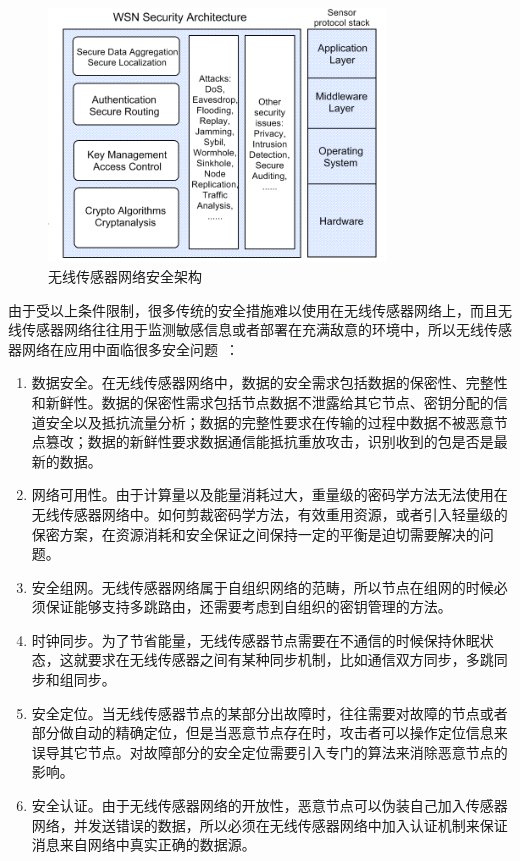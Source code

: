 \documentclass[a4paper,10pt]{article}
\begin{document}
\begin{figure}[htbp]
  \centering
  \includegraphics[width=0.8\textwidth,keepaspectratio]{wsn_sec_map}
  \caption{\label{wsn_sec_map}无线传感器网络安全架构~\cite{Li2005}}
\end{figure}

由于受以上条件限制，很多传统的安全措施难以使用在无线传感器网络上，而且无线传感器网络往往用于监测敏感信息或者部署在充满敌意的环境中，所以无线传感器网络在应用中面临很多安全问题~\cite{Xiao2006}：

\begin{enumerate}

\item 数据安全。在无线传感器网络中，数据的安全需求包括数据的保密性、完整性和新鲜性。数据的保密性需求包括节点数据不泄露给其它节点、密钥分配的信道安全以及抵抗流量分析；数据的完整性要求在传输的过程中数据不被恶意节点篡改；数据的新鲜性要求数据通信能抵抗重放攻击，识别收到的包是否是最新的数据。

\item 网络可用性。由于计算量以及能量消耗过大，重量级的密码学方法无法使用在无线传感器网络中。如何剪裁密码学方法，有效重用资源，或者引入轻量级的保密方案，在资源消耗和安全保证之间保持一定的平衡是迫切需要解决的问题。

\item 安全组网。无线传感器网络属于自组织网络的范畴，所以节点在组网的时候必须保证能够支持多跳路由，还需要考虑到自组织的密钥管理的方法。

\item 时钟同步。为了节省能量，无线传感器节点需要在不通信的时候保持休眠状态，这就要求在无线传感器之间有某种同步机制，比如通信双方同步，多跳同步和组同步。

\item 安全定位。当无线传感器节点的某部分出故障时，往往需要对故障的节点或者部分做自动的精确定位，但是当恶意节点存在时，攻击者可以操作定位信息来误导其它节点。对故障部分的安全定位需要引入专门的算法来消除恶意节点的影响。

\item 安全认证。由于无线传感器网络的开放性，恶意节点可以伪装自己加入传感器网络，并发送错误的数据，所以必须在无线传感器网络中加入认证机制来保证消息来自网络中真实正确的数据源。

\end{enumerate}
\end{document}
